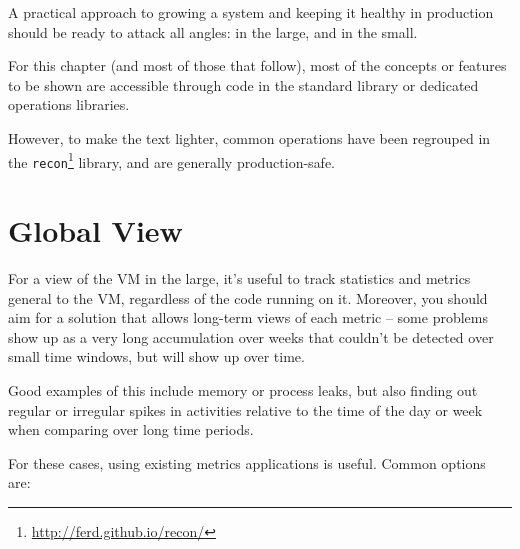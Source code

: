 \documentclass[11pt, oneside]{book}   	%
\newcommand{\otpapp}[1]{\Verb`#1`}
\begin{document}
A practical approach to growing a system and keeping it healthy in production should be ready to attack all angles: in the large, and in the small.

For this chapter (and most of those that follow), most of the concepts or features to be shown are accessible through code in the standard library or dedicated operations libraries. 

However, to make the text lighter, common operations have been regrouped in the \otpapp{recon}\footnote{\href{http://ferd.github.io/recon/}{http://ferd.github.io/recon/}} library, and are generally production-safe.

\section{Global View}
\label{sec:global-view}

For a view of the VM in the large, it's useful to track statistics and metrics general to the VM, regardless of the code running on it. Moreover, you should aim for a solution that allows long-term views of each metric -- some problems show up as a very long accumulation over weeks that couldn't be detected over small time windows, but will show up over time.

Good examples of this include memory or process leaks, but also finding out regular or irregular spikes in activities relative to the time of the day or week when comparing over long time periods.

For these cases, using existing metrics applications is useful. Common options are:
\end{document}
